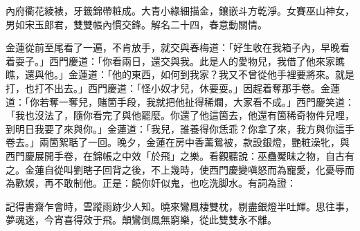 \begin{myquote}
內府衢花綾裱，牙籤錦帶粧成。大青小綠細描金，鑲嵌斗方乾淨。女賽巫山神女，男如宋玉郎君，雙雙帳內慣交鋒。解名二十四，春意動關情。
\end{myquote}

金蓮從前至尾看了一遍，不肯放手，就交與春梅道：「好生收在我箱子內，早晚看着耍子。」{}西門慶道：「你看兩日，還交與我。此是人的愛物兒，我借了他來家瞧瞧，還與他。」金蓮道：「他的東西，如何到我家？我又不曾從他手裡要將來。就是打，也打不出去。」{}西門慶道：「怪小奴才兒，休要耍。」因趕着奪那手卷。金蓮道：「你若奪一奪兒，賭箇手段，我就把他扯得稀爛，大家看不成。」{}西門慶笑道：「我也沒法了，隨你看完了與他罷麼。你還了他這箇去，他還有箇稀奇物件兒哩，到明日我要了來與你。」金蓮道：「我兒，誰養得你恁乖？{}你拿了來，我方與你這手卷去。」兩箇絮聒了一回。晚夕，金蓮在房中香薰鴛被，款設銀燈，艷粧澡牝，與西門慶展開手卷，在錦帳之中效「於飛」之樂。{}看觀聽說：巫蠱魘昧之物，自古有之。金蓮自從叫劉瞎子回背之後，不上幾時，使西門慶變嗔怒而為寵愛，化憂辱而為歡娛，再不敢制他。正是：饒你奸似鬼，也吃洗脚水。有詞為證：

\begin{myquote}
記得書齋乍會時，雲蹤雨跡少人知。曉來鸞鳳棲雙枕，剔盡銀燈半吐輝。思往事，夢魂迷，今宵喜得效于飛。顛鸞倒鳳無窮樂，從此雙雙永不離。
\end{myquote}

 

